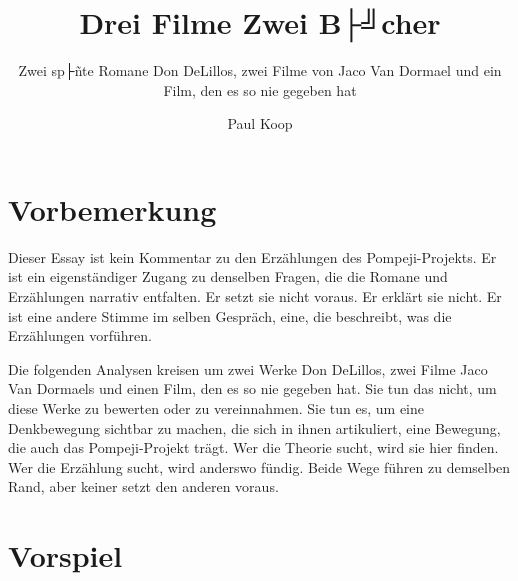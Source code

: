 \documentclass[
  ngerman,
]{article}
\title{Drei Filme Zwei B├╝cher}
\subtitle{Zwei sp├ñte Romane Don DeLillos, zwei Filme von Jaco Van
Dormael und ein Film, den es so nie gegeben hat}
\author{Paul Koop}
\date{}
\begin{document}
\maketitle

{
\setcounter{tocdepth}{3}
\tableofcontents
}
\section{Vorbemerkung}\label{vorbemerkung}

Dieser Essay ist kein Kommentar zu den Erzählungen des Pompeji-Projekts.
Er ist ein eigenständiger Zugang zu denselben Fragen, die die Romane und
Erzählungen narrativ entfalten. Er setzt sie nicht voraus. Er erklärt
sie nicht. Er ist eine andere Stimme im selben Gespräch, eine, die
beschreibt, was die Erzählungen vorführen.

Die folgenden Analysen kreisen um zwei Werke Don DeLillos, zwei Filme
Jaco Van Dormaels und einen Film, den es so nie gegeben hat. Sie tun das
nicht, um diese Werke zu bewerten oder zu vereinnahmen. Sie tun es, um
eine Denkbewegung sichtbar zu machen, die sich in ihnen artikuliert,
eine Bewegung, die auch das Pompeji-Projekt trägt. Wer die Theorie
sucht, wird sie hier finden. Wer die Erzählung sucht, wird anderswo
fündig. Beide Wege führen zu demselben Rand, aber keiner setzt den
anderen voraus.

\section{Vorspiel}\label{vorspiel}
\end{document}
